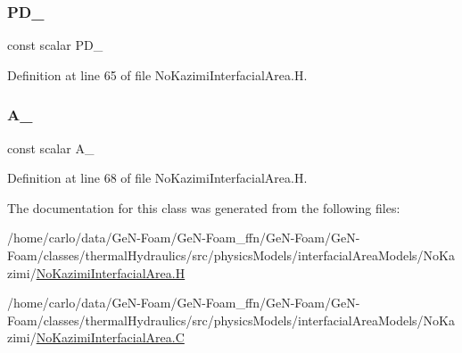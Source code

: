 \subsubsection{\texorpdfstring{P\+D\+\_\+}{PD\_}}
{\footnotesize\ttfamily const scalar P\+D\+\_\+\hspace{0.3cm}{\ttfamily [protected]}}



Definition at line 65 of file No\+Kazimi\+Interfacial\+Area.\+H.

\mbox{\label{classFoam_1_1interfacialAreaModels_1_1NoKazimi_a964d35f7a0122b4371643835f79989e6}} 
\subsubsection{\texorpdfstring{A\+\_\+}{A\_}}
{\footnotesize\ttfamily const scalar A\+\_\+\hspace{0.3cm}{\ttfamily [protected]}}



Definition at line 68 of file No\+Kazimi\+Interfacial\+Area.\+H.



The documentation for this class was generated from the following files\+:\begin{DoxyCompactItemize}
\item 
/home/carlo/data/\+Ge\+N-\/\+Foam/\+Ge\+N-\/\+Foam\+\_\+ffn/\+Ge\+N-\/\+Foam/\+Ge\+N-\/\+Foam/classes/thermal\+Hydraulics/src/physics\+Models/interfacial\+Area\+Models/\+No\+Kazimi/\hyperlink{NoKazimiInterfacialArea_8H}{No\+Kazimi\+Interfacial\+Area.\+H}\item 
/home/carlo/data/\+Ge\+N-\/\+Foam/\+Ge\+N-\/\+Foam\+\_\+ffn/\+Ge\+N-\/\+Foam/\+Ge\+N-\/\+Foam/classes/thermal\+Hydraulics/src/physics\+Models/interfacial\+Area\+Models/\+No\+Kazimi/\hyperlink{NoKazimiInterfacialArea_8C}{No\+Kazimi\+Interfacial\+Area.\+C}\end{DoxyCompactItemize}
